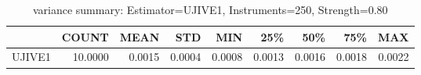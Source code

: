 \begin{table}[ht]
\centering
\caption{variance summary: Estimator=UJIVE1, Instruments=250, Strength=0.80}
\begin{tabular}{lrrrrrrrr}
\toprule
 & COUNT & MEAN & STD & MIN & 25\% & 50\% & 75\% & MAX \\
\midrule
UJIVE1 & 10.0000 & 0.0015 & 0.0004 & 0.0008 & 0.0013 & 0.0016 & 0.0018 & 0.0022 \\
\bottomrule
\end{tabular}
\end{table}
